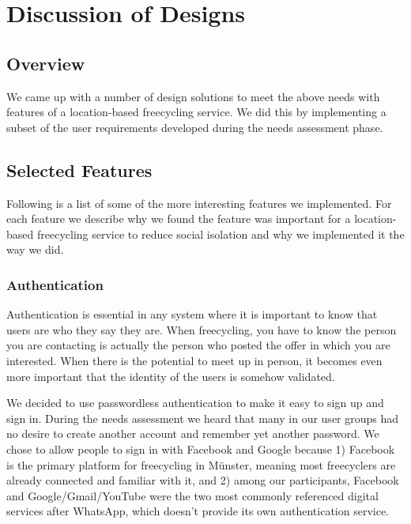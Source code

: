 

\section{Discussion of Designs}
\label{sec:features}

\subsection*{Overview}

We came up with a number of design solutions to meet the above needs with features of a location-based freecycling service. We did this by implementing a subset of the user requirements developed during the needs assessment phase.

\subsection*{Selected Features}

Following is a list of some of the more interesting features we implemented. For each feature we describe why we found the feature was important for a location-based freecycling service to reduce social isolation and why we implemented it the way we did.

\subsubsection*{Authentication}

Authentication is essential in any system where it is important to know that users are who they say they are. When freecycling, you have to know the person you are contacting is actually the person who posted the offer in which you are interested. When there is the potential to meet up in person, it becomes even more important that the identity of the users is somehow validated.

We decided to use passwordless authentication to make it easy to sign up and sign in. During the needs assessment we heard that many in our user groups had no desire to create another account and remember yet another password. We chose to allow people to sign in with Facebook and Google because 1) Facebook is the primary platform for freecycling in Münster, meaning most freecyclers are already connected and familiar with it, and 2) among our participants, Facebook and Google/Gmail/YouTube were the two most commonly referenced digital services after WhatsApp, which doesn't provide its own authentication service.

